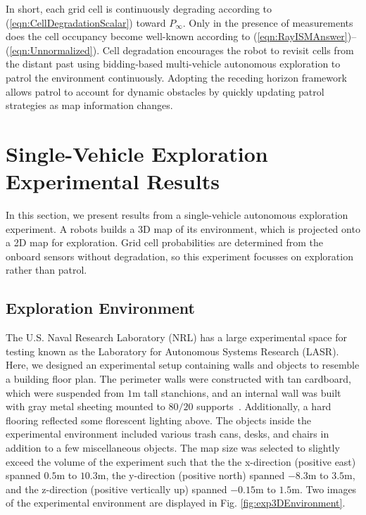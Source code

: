 \documentclass[smallextended]{svjour3}       %
\newcommand{\refeqn}[1]{(\ref{eqn:#1})}
\begin{document}
In short, each grid cell is continuously degrading according to \refeqn{CellDegradationScalar} toward $P_\infty$. Only in the presence of measurements does the cell occupancy become well-known according to \refeqn{RayISMAnswer}--\refeqn{Unnormalized}. Cell degradation encourages the robot to revisit cells from the distant past using bidding-based multi-vehicle autonomous exploration to patrol the environment continuously. Adopting the receding horizon framework allows patrol to account for dynamic obstacles by quickly updating patrol strategies as map information changes.







\section{Single-Vehicle Exploration Experimental Results}
\label{sec:ExploreExperiment}

In this section, we present results from a single-vehicle autonomous exploration experiment. A robots builds a 3D map of its environment, which is projected onto a 2D map for exploration. Grid cell probabilities are determined from the onboard sensors without degradation, so this experiment focusses on exploration rather than patrol.

\subsection{Exploration Environment}

The U.S. Naval Research Laboratory (NRL) has a large experimental space for testing known as the Laboratory for Autonomous Systems Research (LASR). Here, we designed an experimental setup containing walls and objects to resemble a building floor plan. The perimeter walls were constructed with tan cardboard, which were suspended from $1$m tall stanchions, and an internal wall was built with gray metal sheeting mounted to $80/20$ supports~\cite{url_8020}. Additionally, a hard flooring reflected some florescent lighting above. The objects inside the experimental environment included various trash cans, desks, and chairs in addition to a few miscellaneous objects. The map size was selected to slightly exceed the volume of the experiment such that the the x-direction (positive east) spanned $0.5$m to $10.3$m, the y-direction (positive north) spanned $-8.3$m to $3.5$m, and the z-direction (positive vertically up) spanned $-0.15$m to $1.5$m. Two images of the experimental environment are displayed in Fig. \ref{fig:exp3DEnvironment}.
\end{document}
